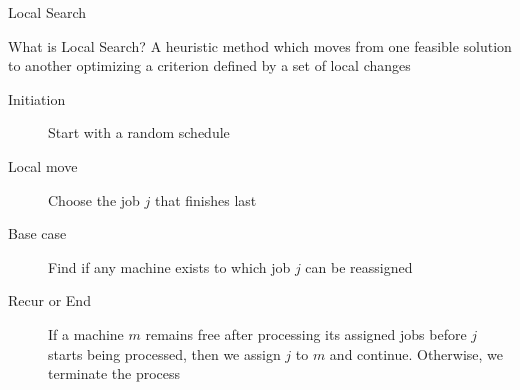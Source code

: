 \documentclass[aspectratio=169,xcolor=dvipsnames, t]{beamer}
\begin{document}

\begin{frame}{Local Search}
    \begin{block}{What is Local Search?}
        A heuristic method which moves from one feasible solution to another optimizing a criterion defined by a set of local changes
    \end{block} \pause

    \begin{description}
        \item[Initiation] Start with a random schedule \pause
        \item[Local move] Choose the job $j$ that finishes last \pause
        \item[Base case] Find if any machine exists to which job $j$ can be reassigned \pause
        \item[Recur or End] If a machine $m$ remains free after processing its assigned jobs before $j$ starts being processed, then we assign $j$ to $m$ and continue. Otherwise, we terminate the process
    \end{description}
\end{frame}
\end{document}

